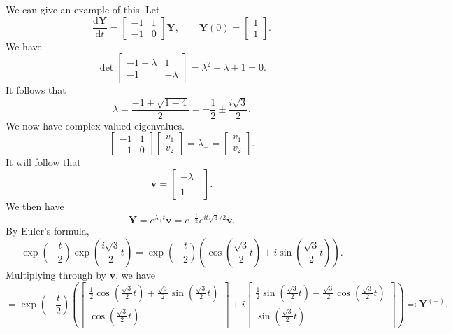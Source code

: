 
We can give an example of this. Let
\[
	\frac{\mathrm{d}\mathbf{Y}}{\mathrm{d}t} = \begin{bmatrix} -1&1 \\ -1&0 \end{bmatrix} \mathbf{Y},\qquad \mathbf{Y}(0)=\begin{bmatrix} 1 \\ 1 \end{bmatrix} 
.\]
We have
\[
	\det \begin{bmatrix} -1-\lambda &1 \\ -1&-\lambda  \end{bmatrix} =\lambda ^2+\lambda +1 =0
.\]
It follows that
\[
	\lambda= \frac{-1\pm \sqrt{1-4} }{2}=-\frac{1}{2}\pm \frac{i\sqrt{3} }{2}
.\]
We now have complex-valued eigenvalues.
\[
	\begin{bmatrix} -1&1 \\ -1&0 \end{bmatrix} \begin{bmatrix} v_1 \\ v_2 \end{bmatrix} =\lambda_+ = \begin{bmatrix} v_1 \\ v_2 \end{bmatrix} 
.\]
It will follow that
\[
	\mathbf{v}=\begin{bmatrix} -\lambda _+ \\ 1 \end{bmatrix} 
.\]
We then have
\[
	\mathbf{Y}=e^{\lambda _+t}\mathbf{v}=e^{-\frac{t}{2}}e^{it\sqrt{3}/2} \mathbf{v}
.\]
By Euler's formula,
\[
	\exp \left(- \frac{t}{2} \right) \exp \left( \frac{i\sqrt{3} }{2}t \right) =\exp \left( -\frac{t}{2} \right) \left( \cos \left( \frac{\sqrt{3} }{2}t \right) + i\sin \left( \frac{\sqrt{3} }{2}t \right) \right) 
.\]
Multiplying through by $\mathbf{v}$, we have
\[
	=\exp \left( -\frac{t}{2} \right) \left( \begin{bmatrix} \frac{1}{2}\cos \left( \frac{\sqrt{3} }{2}t \right) + \frac{\sqrt{3}  }{2}\sin \left( \frac{\sqrt{3} }{2}t \right)  \\ \cos \left( \frac{\sqrt{3} }{2}t \right)  \end{bmatrix} + i \begin{bmatrix} \frac{1}{2}\sin  \left( \frac{\sqrt{3} }{2}t \right) -\frac{\sqrt{3} }{2}\cos \left( \frac{\sqrt{3} }{2}t \right)  \\ \sin \left( \frac{\sqrt{3} }{2}t \right)  \end{bmatrix}  \right) \eqqcolon \mathbf{Y}^{(+)}
.\]

